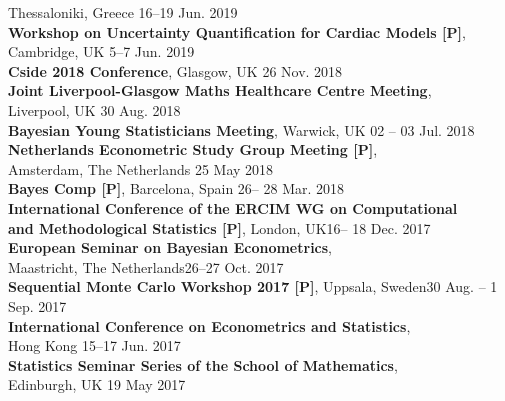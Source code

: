 \documentclass[margin,line]{resume}
\begin{document}
\begin{resume}
	Thessaloniki, Greece \hfill 16--19 Jun. 2019 \vspace{1mm} \\
\newpage		
	\textbf{Workshop on Uncertainty Quantification for Cardiac Models [P]},\\
	Cambridge, UK \hfill 5--7 Jun. 2019 \vspace{1mm} \\		
	\textbf{Cside 2018 Conference}, Glasgow, UK \hfill 26 Nov. 2018 \vspace{1mm} \\
	\textbf{ Joint Liverpool-Glasgow Maths Healthcare Centre Meeting},\\
	Liverpool, UK \hfill 30 Aug. 2018 \vspace{1mm} \\	
	\textbf{ Bayesian Young Statisticians Meeting}, Warwick, UK \hfill 02 -- 03 Jul. 2018 \vspace{1mm} \\
	\textbf{ Netherlands Econometric Study Group Meeting [P]}, \\
	Amsterdam, The Netherlands \hfill 25 May 2018  \vspace{1mm} \\ 
	\textbf{ Bayes Comp [P]}, Barcelona, Spain \hfill 26-- 28 Mar. 2018 \vspace{1mm} \\
	\textbf{ International Conference of the ERCIM WG on Computational}\\
	\textbf{and Methodological Statistics [P]}, London, UK\hfill 16-- 18 Dec. 2017 \vspace{1mm} \\ 	
	\textbf{ European Seminar on Bayesian Econometrics},\\
	 Maastricht, The Netherlands\hfill 26--27 Oct. 2017 \vspace{1mm} \\ 
	\textbf{Sequential Monte Carlo Workshop 2017 [P]}, Uppsala, Sweden\hfill 30 Aug. -- 1 Sep. 2017 \vspace{1mm} \\ 
	\textbf{ International Conference on Econometrics and Statistics},\\ Hong Kong \hfill 15--17 Jun. 2017 \vspace{1mm} \\ 
    \textbf{Statistics Seminar Series of the School of Mathematics},\\ Edinburgh, UK \hfill 19 May 2017 \vspace{1mm} \\ 

\end{resume}
\end{document}
